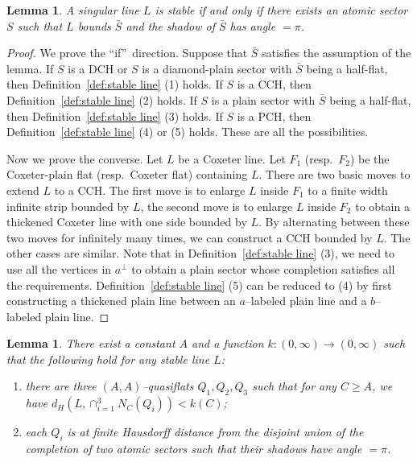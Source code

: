 \documentclass[11pt]{amsart}
\newtheorem{lemma}[theorem]{Lemma}
\theoremstyle{definition}
\begin{document}
\begin{lemma}
	\label{lem:characterize stable line}
A singular line $L$ is stable if and only if there exists an atomic sector $S$ such that $L$ bounds $\bar{S}$ and the shadow of $\bar{S}$ has angle $=\pi$.
\end{lemma}

\begin{proof}
We prove the \textquotedblleft if\textquotedblright\ direction. Suppose that $\bar{S}$ satisfies the assumption of the lemma. If $S$ is a DCH or $S$ is a diamond-plain sector with $\bar{S}$ being a half-flat, then Definition~\ref{def:stable line} (1) holds. If $S$ is a CCH, then Definition~\ref{def:stable line} (2) holds. If $S$ is a plain sector with $\bar{S}$ being a half-flat, then Definition~\ref{def:stable line} (3) holds. If $S$ is a PCH, then Definition~\ref{def:stable line} (4) or (5) holds. These are all the possibilities.

Now we prove the converse. Let $L$ be a Coxeter line. Let $F_1$ (resp.\ $F_2$) be the Coxeter-plain flat (resp.\ Coxeter flat) containing $L$. There are two basic moves to extend $L$ to a CCH. The first move is to enlarge $L$ inside $F_1$ to a finite width infinite strip bounded by $L$, the second move is to enlarge $L$ inside $F_2$ to obtain a thickened Coxeter line with one side bounded by $L$. By alternating between these two moves for infinitely many times, we can construct a CCH bounded by $L$. The other cases are similar. Note that in Definition~\ref{def:stable line} (3), we need to use all the vertices in $a^{\perp}$ to obtain a plain sector whose completion satisfies all the requirements. Definition~\ref{def:stable line} (5) can be reduced to (4) by first constructing a thickened plain line between an $a$--labeled plain line and a $b$--labeled plain line.
\end{proof}

\begin{lemma}
	\label{lem:stable lines are intersections}
There exist a constant $A$ and a function $k\colon (0,\infty)\to (0,\infty)$ such that the following hold for any stable line $L$:
\begin{enumerate}
	\item there are three $(A,A)$--quasiflats $Q_1,Q_2,Q_3$ such that for any $C\ge A$, we have $d_H(L,\cap_{i=1}^3N_C(Q_i))<k(C)$;
	\item each $Q_i$ is at finite Hausdorff distance from the disjoint union of the completion of two atomic sectors such that their shadows have angle $=\pi$.
\end{enumerate}
\end{lemma}
\end{document}
